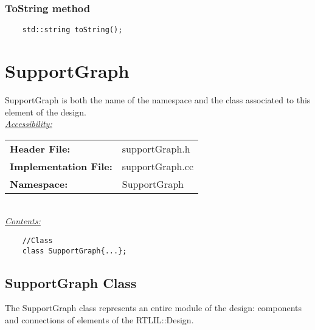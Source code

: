 \documentclass{article}
\newcommand{\sectionbreak}{\clearpage}
\begin{document}
\subsubsection{ToString method}

\begin{mdframed}[hidealllines=true, backgroundcolor=magenta!10]
	\begin{lstlisting}
	std::string toString();
	\end{lstlisting}
\end{mdframed}

\sectionbreak{\clearpage}


\section{SupportGraph}

SupportGraph is both the name of the namespace and the class associated to this element of the design.\\

\underline{\textit{\underline{Accessibility: }}}\\

\begin{tabular}{ll}
	\textbf{Header File:} & supportGraph.h\\
	\textbf{Implementation File:} & supportGraph.cc\\
	\textbf{Namespace: } & SupportGraph\\
\end{tabular}\\

\underline{\textit{\underline{Contents: }}}\\

\begin{mdframed}[hidealllines=true, backgroundcolor=green!10]
	\begin{lstlisting}
	//Class
	class SupportGraph{...};
	\end{lstlisting}
\end{mdframed}

\subsection{SupportGraph Class}

The SupportGraph class represents an entire module of the design: components and connections of elements of the RTLIL::Design.\\
\end{document}
